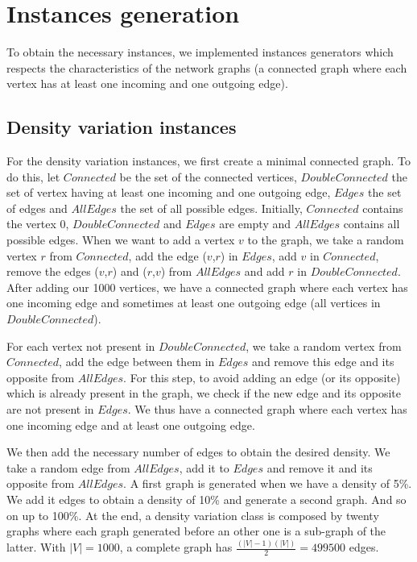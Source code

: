 \section{Instances generation}
To obtain the necessary instances, we implemented instances generators which respects the characteristics of the network graphs (a connected graph where each vertex has at least one incoming and one outgoing edge).

\subsection{Density variation instances}
For the density variation instances, we first create a minimal connected graph. To do this, let $Connected$ be the set of the connected vertices, $DoubleConnected$ the set of vertex having at least one incoming and one outgoing edge, $Edges$ the set of edges and $AllEdges$ the set of all possible edges. Initially, $Connected$ contains the vertex 0, $DoubleConnected$ and $Edges$ are empty and $AllEdges$ contains all possible edges. When we want to add a vertex $v$ to the graph, we take a random vertex $r$ from $Connected$, add the edge ($v$,$r$) in $Edges$, add $v$ in $Connected$, remove the edges ($v$,$r$) and ($r$,$v$) from $AllEdges$ and add $r$ in $DoubleConnected$. After adding our 1000 vertices, we have a connected graph where each vertex has one incoming edge and sometimes at least one outgoing edge (all vertices in $DoubleConnected$).

For each vertex not present in $DoubleConnected$, we take a random vertex from $Connected$, add the edge between them in $Edges$ and remove this edge and its opposite from $AllEdges$. For this step, to avoid adding an edge (or its opposite) which is already present in the graph, we check if the new edge and its opposite are not present in $Edges$. We thus have a connected graph where each vertex has one incoming edge and at least one outgoing edge.

We then add the necessary number of edges to obtain the desired density. We take a random edge from $AllEdges$, add it to $Edges$ and remove it and its opposite from $AllEdges$. A first graph is generated when we have a density of 5\%. We add it edges to obtain a density of 10\% and generate a second graph. And so on up to 100\%. At the end, a density variation class is composed by twenty graphs where each graph generated before an other one is a sub-graph of the latter. With $|V|=1000$, a complete graph has $\frac{(|V|-1)(|V|)}{2} = 499500$ edges.

